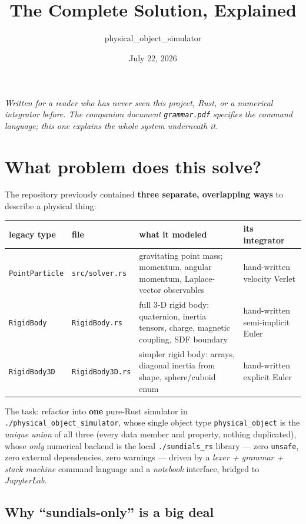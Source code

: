 \documentclass[11pt]{article}
\title{\code{physical\_object\_simulator}\\[2pt]
       \large The Complete Solution, Explained}
\author{physical\_object\_simulator}
\date{July 22, 2026}
\newcommand{\code}[1]{\texttt{#1}}
\begin{document}
\maketitle
\tableofcontents

\emph{Written for a reader who has never seen this project, Rust, or a
numerical integrator before. The companion document \code{grammar.pdf}
specifies the command language; this one explains the whole system
underneath it.}

\section{What problem does this solve?}

The repository previously contained \textbf{three separate, overlapping
ways} to describe a physical thing:

\begin{center}
\begin{tabular}{llp{5.4cm}l}
\textbf{legacy type} & \textbf{file} & \textbf{what it modeled} & \textbf{its integrator}\\\hline
\code{PointParticle} & \code{src/solver.rs} & gravitating point mass; momentum, angular momentum, Laplace-vector observables & hand-written velocity Verlet\\
\code{RigidBody} & \code{RigidBody.rs} & full 3-D rigid body: quaternion, inertia tensors, charge, magnetic coupling, SDF boundary & hand-written semi-implicit Euler\\
\code{RigidBody3D} & \code{RigidBody3D.rs} & simpler rigid body: arrays, diagonal inertia from shape, sphere/cuboid enum & hand-written explicit Euler\\
\end{tabular}
\end{center}

The task: refactor into \textbf{one} pure-Rust simulator in
\code{./physical\_object\_simulator}, whose single object type
\code{physical\_object} is the \emph{unique union} of all three (every
data member and property, nothing duplicated), whose \emph{only}
numerical backend is the local \code{./sundials\_rs} library --- zero
\code{unsafe}, zero external dependencies, zero warnings --- driven by a
\emph{lexer + grammar + stack machine} command language and a
\emph{notebook} interface, bridged to \emph{JupyterLab}.

\subsection{Why ``sundials-only'' is a big deal}
\end{document}
